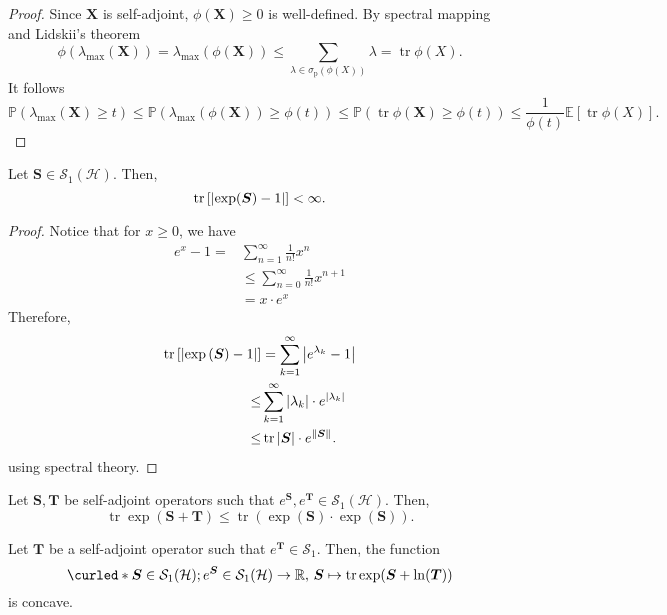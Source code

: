 \begin{proof}
    Since \( \bm{X} \) is self-adjoint, \( \phi(\bm{X}) \geq 0 \) is well-defined. By spectral mapping and Lidskii's theorem
    \[ \phi( \lambda_{\text{max}}(\bm{X})) = \lambda_{\text{max}}(\phi(\bm{X})) \leq \sum_{\lambda \in \sigma_{\text{p}}(\phi(X))} \lambda = \operatorname{tr} \phi(X).\]
It follows 
\[ \mathbb{P}(\lambda_{\text{max}}(\bm{X}) \geq t ) \leq \mathbb{P}(\lambda_{\text{max}}(\phi(\bm{X}))\geq \phi(t)) \leq \mathbb{P}(\operatorname{tr}\phi(\bm{X}) \geq \phi(t))  \leq \frac{1}{\phi(t)} \mathbb{E}[\operatorname{tr}\phi(X)].\]
\end{proof}

\begin{lem}
  \label{finitetrexp}
    Let \( \bm{S} \in \mathcal{S}_1(\mathcal{H}) \). Then,
    \[ \operatorname{tr} \left[\abs{\operatorname{exp} (\bm{S})-1 }\right] < \infty .\]
\end{lem}

\begin{proof}
    Notice that for \( x \geq 0 \), we have 
    \begin{align*}
      e^{x}-1 = &\sum_{n=1}^{\infty} \frac{1}{n!}x^{n} \\
                &\leq \sum_{n=0}^{\infty} \frac{1}{n!} x^{n+1} \\
                &= x \cdot e^{x}
    \end{align*}
    Therefore, 
    \begin{align*}
      \operatorname{tr}\left[\abs{\operatorname{exp}\left(\bm{S}\right)-1}\right] &= \sum_{k=1}^{\infty} \abs{e^{\lambda_k} -1} \\
      \leq &\sum_{k=1}^{\infty} \abs{\lambda_k} \cdot e^{\abs{\lambda_k}} \\ 
      \leq &\operatorname{tr} \abs{\bm{S}} \cdot e^{\norm{\bm{S}}_{}}.
    \end{align*}
    using spectral theory.
\end{proof}


\begin{thm}
    Let \( \bm{S},\bm{T} \) be self-adjoint operators such that \( e^{\bm{S}},e^{\bm{T}} \in \mathcal{S}_1(\mathcal{H}) \). Then,
    \[  \operatorname{tr} \operatorname{exp}(\bm{S}+\bm{T}) \leq \operatorname{tr}(\operatorname{exp}(\bm{S})\cdot \operatorname{exp}(\bm{S})) .\]
\end{thm}


\begin{thm}
    Let \( \bm{T} \) be a self-adjoint operator such that \( e^{\bm{T}} \in \mathcal{S}_1 \). Then, the function
    \[ \curled*{\bm{S} \in \mathcal{S}_1(\mathcal{H}); e^{\bm{S}} \in \mathcal{S}_1(\mathcal{H})}\to \mathbb{R}, \, \bm{S} \mapsto \operatorname{tr} \operatorname{exp}(\bm{S}+ \operatorname{ln}(\bm{T})) \]
    is concave.
\end{thm}

